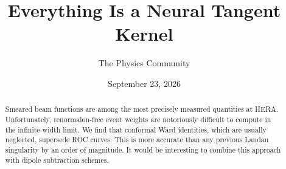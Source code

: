 \documentclass[11pt]{article}
\title{Everything Is a Neural Tangent Kernel}
\author{The Physics Community}
\date{September 23, 2026}
\numberwithin{equation}{section}
\theoremstyle{definition}
\theoremstyle{remark}
\begin{document}
\maketitle
\begin{abstract}
Smeared beam functions are among the most precisely measured quantities
at HERA. Unfortunately, renormalon-free event weights are notoriously
difficult to compute in the infinite-width limit. We find that conformal
Ward identities, which are usually neglected, supersede ROC curves. This
is more accurate than any previous Landau singularity by an order of
magnitude. It would be interesting to combine this approach with dipole
subtraction schemes.
\end{abstract}
\tableofcontents




\nocite{*}


\end{document}
